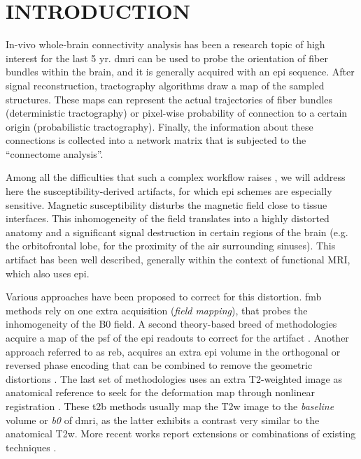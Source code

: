 \section{INTRODUCTION}
\label{sec:intro}
In-vivo whole-brain connectivity analysis has been a research topic of high
  interest for the last 5 yr.
\Gls*{dmri} can be used to probe the orientation of fiber bundles within the
  brain, and it is generally acquired with an \gls*{epi} sequence.
After signal reconstruction, tractography algorithms draw a map of the sampled
  structures.
These maps can represent the actual trajectories of fiber bundles
  (deterministic tractography) or pixel-wise probability of connection
  to a certain origin (probabilistic tractography).
Finally, the information about these connections is collected into a network
  matrix that is subjected to the ``connectome analysis''.

Among all the difficulties that such a complex workflow raises \cite{jones_twenty-five_2010},
  we will address here the susceptibility-derived artifacts,
  for which \Gls*{epi} schemes are especially sensitive.
Magnetic susceptibility disturbs the magnetic field close to tissue interfaces.
This inhomogeneity of the field translates into a highly distorted anatomy
  and a significant signal destruction in certain regions of the brain 
  (e.g. the orbitofrontal lobe, for the proximity of the air surrounding sinuses).
This artifact has been well described, generally within the context of functional MRI,
  which also uses \gls*{epi}.

Various approaches have been proposed to correct for this distortion.
\Gls*{fmb} methods \cite{jezzard_correction_1995} rely on one extra
  acquisition (\emph{field mapping}), that probes the inhomogeneity of the
  B0 field.
A second theory-based breed of methodologies acquire a map of the \acrlong*{psf}
  of the \gls*{epi} readouts to correct for the artifact \cite{robson_measurement_1997}.
Another approach referred to as \gls*{reb}, acquires an extra \gls*{epi} volume in the
  orthogonal or reversed phase encoding that can be combined to remove the geometric
  distortions \cite{cordes_geometric_2000,chiou_simple_2000}.
The last set of methodologies uses an extra T2-weighted image as anatomical reference
  to seek for the deformation map through nonlinear registration 
  \cite{kybic_unwarping_2000,studholme_accurate_2000}.
These \gls*{t2b} methods usually map the T2w image to the \emph{baseline} volume or
  \textit{b0} of \gls*{dmri}, as the latter exhibits a contrast very similar to the
  anatomical T2w.
More recent works report extensions or combinations of existing techniques 
  \cite{andersson_how_2003,zaitsev_point_2004,%
  holland_efficient_2010,andersson_comprehensive_2012}.

